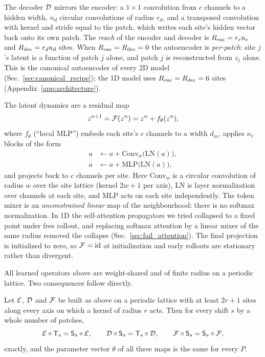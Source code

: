 The decoder $\mathcal{D}$ mirrors the encoder: a $1\times1$ convolution from
$c$ channels to a hidden width, $n_d$ circular convolutions of radius
$r_d$, and a transposed convolution with kernel and stride equal to the
patch, which writes each site's hidden vector back onto its own patch.
The \emph{reach} of the encoder and decoder is $R_{\mathrm{enc}} = r_e n_e$ and
$R_{\mathrm{dec}} = r_d n_d$ sites. When $R_{\mathrm{enc}}=R_{\mathrm{dec}}=0$ the autoencoder is
\emph{per-patch}: site $j$'s latent is a function of patch $j$ alone,
and patch $j$ is reconstructed from $z_j$ alone. This is the canonical
autoencoder of every 2D model (Sec.~\ref{sec:canonical_recipe}); the 1D
model uses $R_{\mathrm{enc}}=R_{\mathrm{dec}}=6$ sites (Appendix~\ref{app:architecture}).

The latent dynamics are a residual map
\begin{equation}
  z^{n+1} = \mathcal{F}(z^{n}) = z^{n} + f_\theta(z^{n}),
  \label{eq:propagator}
\end{equation}
where $f_\theta$ (``local MLP'') embeds each site's $c$ channels to a
width $d_m$, applies $n_\ell$ blocks of the form
\begin{equation}
  \begin{aligned}
  a &\leftarrow a + \mathrm{Conv}_{w}\big(\mathrm{LN}(a)\big),\\
  a &\leftarrow a + \mathrm{MLP}\big(\mathrm{LN}(a)\big),
  \end{aligned}
  \label{eq:mixer_block}
\end{equation}
and projects back to $c$ channels per site. Here $\mathrm{Conv}_{w}$ is
a circular convolution of radius $w$ over the site lattice (kernel
$2w+1$ per axis), $\mathrm{LN}$ is layer normalization over channels at
each site, and $\mathrm{MLP}$ acts on each site independently. The token
mixer is an \emph{unconstrained linear} map of the neighbourhood: there
is no softmax normalization. In 1D the self-attention propagators we
tried collapsed to a fixed point under free rollout, and replacing
softmax attention by a linear mixer of the same radius removed the
collapse (Sec.~\ref{sec:fail_attention}). The final projection is initialized to zero, so
$\mathcal{F}=\mathrm{id}$ at initialization and early rollouts are stationary
rather than divergent.

All learned operators above are weight-shared and of finite radius on a
periodic lattice. Two consequences follow directly.

\begin{proposition}
\label{prop:equivariance}
Let $\mathcal{E}$, $\mathcal{D}$ and $\mathcal{F}$ be built as above on a periodic lattice with at
least $2r+1$ sites along every axis on which a kernel of radius $r$ acts.
Then for every shift $s$ by a whole number of patches,
\begin{equation}
  \mathcal{E}\circ\mathsf{T}_{s} = \mathsf{S}_s\circ\mathcal{E}, \qquad
  \mathcal{D}\circ\mathsf{S}_s = \mathsf{T}_{s}\circ\mathcal{D}, \qquad
  \mathcal{F}\circ\mathsf{S}_s = \mathsf{S}_s\circ\mathcal{F},
  \label{eq:equivariance}
\end{equation}
exactly, and the parameter vector $\theta$ of all three maps is the same
for every $P$.
\end{proposition}

